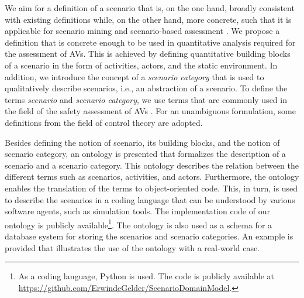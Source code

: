 We aim for a definition of a scenario that is, on the one hand, broadly consistent with existing definitions \autocite{geyer2014, ulbrich2015, elrofai2016scenario} while, on the other hand, more concrete, such that it is applicable for scenario mining \autocite{elrofai2016scenario} and scenario-based assessment \autocite{stellet2015taxonomy, deGelder2017assessment}. We propose a definition that is concrete enough to be used in quantitative analysis required for the assessment of AVs. This is achieved by defining quantitative building blocks of a scenario in the form of activities, actors, and the static environment. In addition, we introduce the concept of a \emph{scenario category}  
that is used to qualitatively describe scenarios, i.e., an abstraction of a scenario. 
\cstart To define the terms \emph{scenario} and \emph{scenario category}, we use terms that are commonly used in the field of the safety assessment of AVs \autocite{catapult2018musicc,catapult2018regulating,sigsim2019glossary,openscenario,ulbrich2015,geyer2014}. For an unambiguous formulation, some definitions from the field of control theory are adopted.\cend


Besides defining the notion of scenario, its building blocks, and the notion of scenario category, an ontology is presented that formalizes the description of a scenario and a scenario category. 
This ontology describes the relation between the different terms such as scenarios, activities, and actors.
Furthermore, the ontology enables the translation of the terms to object-oriented code.
This, in turn, is used to describe the scenarios in a coding language that can be understood by various software agents, such as simulation tools. The implementation code of our ontology is publicly available\footnote{As a coding language, Python is used. The code is publicly available at \url{https://github.com/ErwindeGelder/ScenarioDomainModel}.}. 
The ontology is also used as a schema for a database system for storing the scenarios and scenario categories.
An example is provided that illustrates the use of the ontology with a real-world case.

